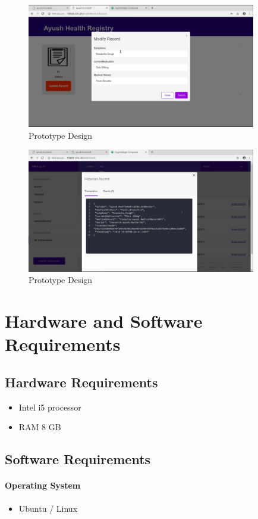 \documentclass[11pt]{report}
\begin{document}
    \begin{figure}
        \centering
        \includegraphics[scale=0.3,width=10cm]{Proto5.png}
        \caption{Prototype Design}
        \label{fig:my_label}
    \end{figure}
    \begin{figure}
        \centering
        \includegraphics[scale=0.3,width=10cm]{Proto6.png}
        \caption{Prototype Design}
        \label{fig:my_label}
    \end{figure}
\chapter{Hardware and Software Requirements}
        \section{Hardware Requirements}
                \begin{itemize}
                    \item Intel i5 processor
                    \item RAM 8 GB
                \end{itemize}
        \section{Software Requirements}  
                \subsubsection{Operating System}
                            \begin{itemize}
                                \item Ubuntu / Linux
                            \end{itemize} 
\end{document}
